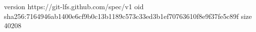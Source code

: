 version https://git-lfs.github.com/spec/v1
oid sha256:7164946ab1400e6cf9b0c13b1189c573c33ed3b1ef70763610f8e9f37fe5c89f
size 40208

